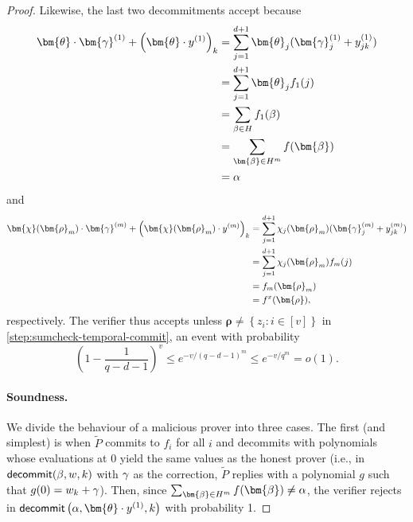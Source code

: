 \documentclass[10pt,a4paper]{article}
\newif\iflipics\lipicsfalse
\theoremstyle{definition}
\renewcommand{\set}[1]{\left\{#1\right\}}
\newcommand{\vcommitlength}{v}
\newcommand{\vcommitstring}{z}
\newcommand{\pcommitstring}{y}
\newcommand{\dimension}{m}
\newcommand{\degree}{d}
\newcommand{\fieldsize}{q}
\newcommand{\evaluationpoint}{\bm{\fe2}}
\newcommand{\fingerprinttuple}{\bm{\rho}}
\newcommand{\cubeside}{H}
\def\fe#1{
    \ifnum#1=1
        \alpha
    \else
    \ifnum#1=2
        \beta
    \else
    \ifnum#1=3
        \gamma
    \fi\fi\fi
}
\begin{document}
\begin{proof}
    Likewise, the last two decommitments accept because
    \begin{align*}
        \bm{\theta} \cdot \bm{\fe3}^{(1)} + \left(\bm{\theta} \cdot \pcommitstring^{(1)}\right)_k &= \sum_{j = 1}^{\degree + 1} \bm{\theta}_j (\bm{\fe3}^{(1)}_j + \pcommitstring^{(1)}_{jk})\\
        &= \sum_{j = 1}^{\degree + 1} \bm{\theta}_j f_1(j)\\
        &= \sum_{\fe2 \in \cubeside} f_1(\fe2)\\
        &= \sum_{\evaluationpoint \in \cubeside^\dimension} f(\evaluationpoint)\\
        &= \fe1
    \end{align*}
    and
    \begin{align*}
        \bm{\chi}(\fingerprinttuple_\dimension) \cdot \bm{\fe3}^{(\dimension)} + \left(\bm{\chi}(\fingerprinttuple_\dimension) \cdot \pcommitstring^{(\dimension)}\right)_k &= \sum_{j = 1}^{\degree + 1} \chi_j(\fingerprinttuple_\dimension) (\bm{\fe3}^{(\dimension)}_j + \pcommitstring^{(\dimension)}_{jk})\\
        &= \sum_{j = 1}^{\degree + 1} \chi_j(\fingerprinttuple_\dimension) f_\dimension(j)\\
        &= f_\dimension(\fingerprinttuple_\dimension)\\
        &= f^x(\fingerprinttuple),
    \end{align*}
    respectively. The verifier thus accepts unless $\fingerprinttuple \neq \set{\vcommitstring_i : i \in [\vcommitlength]}$ in \cref{step:sumcheck-temporal-commit}, an event with probability
    \begin{equation*}
        \left(1 - \frac1{\fieldsize - \degree - 1}\right)^\vcommitlength \leq e^{-\vcommitlength / (\fieldsize - \degree - 1)^\dimension} \leq e^{-\vcommitlength/\fieldsize^\dimension} = o(1).
    \end{equation*}
    
    \paragraph*{Soundness\iflipics\else.\fi} We divide the behaviour of a malicious prover into three cases. The first (and simplest) is when $\widetilde P$ commits to $f_i$ for all $i$ and decommits with polynomials whose evaluations at $0$ yield the same values as the honest prover (i.e., in $\textsf{decommit}(\fe2, w, k)$ with $\fe3$ as the correction, $\widetilde P$ replies with a polynomial $g$ such that $g(0) = w_k + \fe3$). Then, since $\sum_{\evaluationpoint \in \cubeside^\dimension} f(\evaluationpoint) \neq \fe1$, the verifier rejects in $\textsf{decommit}\left(\fe1, \bm{\theta} \cdot \pcommitstring^{(1)}, k\right)$ with probability 1.
    

\end{proof}
\end{document}
